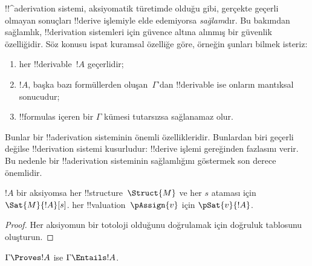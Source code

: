 

      {}
      {}


\begin{explain}
!!^a{derivation} sistemi, aksiyomatik türetimde olduğu gibi, gerçekte geçerli
olmayan sonuçları !!{derive} işlemiyle elde edemiyorsa \emph{sağlam}dır. Bu
bakımdan sağlamlık, !!{derivation} sistemleri için güvence altına alınmış bir
güvenlik özelliğidir. Söz konusu ispat kuramsal özelliğe göre, örneğin şunları
bilmek isteriz:
\begin{enumerate}
\item her !!{derivable}~$!A$ geçerlidir;
\item $!A$, başka bazı formüllerden oluşan~$\Gamma$'dan !!{derivable} ise onların
  mantıksal sonucudur;
\item !!{formula}s içeren bir $\Gamma$ kümesi tutarsızsa sağlanamaz olur.
\end{enumerate}
Bunlar bir !!a{derivation} sisteminin önemli özellikleridir. Bunlardan biri
geçerli değilse !!{derivation} sistemi kusurludur: !!{derive} işlemi
gereğinden fazlasını verir. Bu nedenle bir !!a{derivation} sisteminin sağlamlığını
göstermek son derece önemlidir.
\end{explain}

\begin{prop}
  $!A$ bir aksiyomsa
    {her !!{structure}~$\Struct{M}$ ve her $s$ ataması için
    $\Sat{M}{!A}[s]$.}
    {her !!{valuation}~$\pAssign{v}$ için $\pSat{v}{!A}$.}
\end{prop}

\begin{proof}
  {Her aksiyomun bir totoloji olduğunu doğrulamak için doğruluk tablosunu
  oluşturun.}
\end{proof}

\begin{thm}[Sağlamlık]
$\Gamma \Proves !A$ ise $\Gamma \Entails !A$.
\end{thm}

